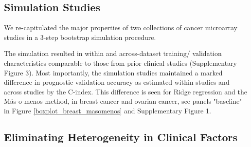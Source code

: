 \documentclass{bioinfo}
\begin{document}
  \subsection{Simulation Studies}

  We re-capitulated the major properties of %
  two collections of cancer microarray studies in a 3-step bootstrap
  simulation procedure. 

  The simulation resulted in within and across-dataset
  training/ validation characteristics comparable to those from prior
  clinical studies (Supplementary Figure 3).  Most importantly, the
  simulation studies maintained a marked difference in prognostic
  validation accuracy as estimated within studies and across studies
  by the C-index. This difference is seen for Ridge regression 
  and the M\'{a}s-o-menos method, in breast cancer and ovarian cancer, 
  see panels "baseline" in Figure \ref{boxplot_breast_masomenos} and Supplementary Figure 1.



  \subsection{Eliminating Heterogeneity in Clinical Factors}
\end{document}
